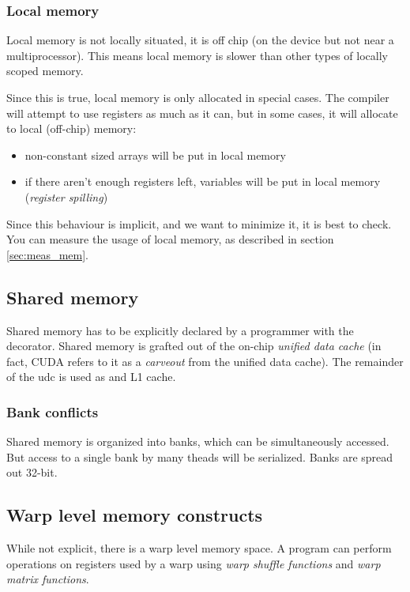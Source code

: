 \documentclass[a4paper,titlepage,12pt]{article}
\begin{document}
\begin{description}[left = \parindent]
\subsubsection{Local memory}

Local memory is not locally situated, it is off chip (on the device but not near a multiprocessor).
This means local memory is slower than other types of locally scoped memory.

Since this is true, local memory is only allocated in special cases.
The compiler will attempt to use registers as much as it can, but in some cases, it will allocate to local (off-chip) memory:
\begin{itemize}
	\item non-constant sized arrays will be put in local memory
	\item if there aren't enough registers left, variables will be put in local memory ({\em register spilling})
\end{itemize}

Since this behaviour is implicit, and we want to minimize it, it is best to check.
You can measure the usage of local memory, as described in section \ref{sec:meas_mem}.


\subsection{Shared memory}

Shared memory has to be explicitly declared by a programmer with the  decorator.
Shared memory is grafted out of the on-chip {\em unified data cache} (in fact, CUDA refers to it as a {\em carveout} from the unified data cache).
The remainder of the udc is used as and L1 cache.

\subsubsection{Bank conflicts}

Shared memory is organized into banks, which can be simultaneously accessed.
But access to a single bank by many theads will be serialized.
Banks are spread out 32-bit.

\subsection{Warp level memory constructs}
\label{ssec:warp_mem}
While not explicit, there is a warp level memory space.
A program can perform operations on registers used by a warp using {\em warp shuffle functions} and {\em warp matrix functions}.


\end{description}
\end{document}
